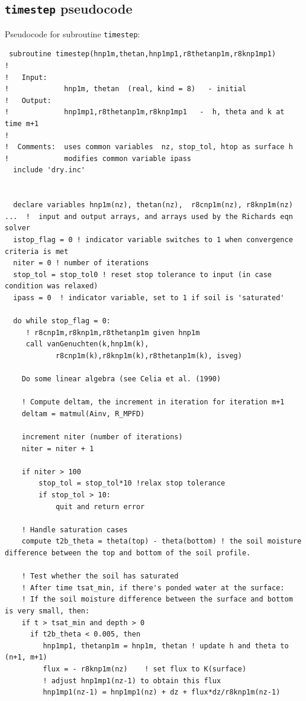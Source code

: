 \documentclass{article}
\newcommand{\code}[1]{\texttt{#1}}
\begin{document}
\subsection{\code{timestep} pseudocode}

Pseudocode for subroutine \code{timestep}:

\begin{lstlisting}
 subroutine timestep(hnp1m,thetan,hnp1mp1,r8thetanp1m,r8knp1mp1)
!
!   Input:
!             hnp1m, thetan  (real, kind = 8)   - initial
!   Output:
!             hnp1mp1,r8thetanp1m,r8knp1mp1   -  h, theta and k at time m+1
!             
!  Comments:  uses common variables  nz, stop_tol, htop as surface h   
!             modifies common variable ipass
  include 'dry.inc'
  

  declare variables hnp1m(nz), thetan(nz),  r8cnp1m(nz), r8knp1m(nz) ...  !  input and output arrays, and arrays used by the Richards eqn solver
  istop_flag = 0 ! indicator variable switches to 1 when convergence criteria is met
  niter = 0 ! number of iterations
  stop_tol = stop_tol0 ! reset stop tolerance to input (in case condition was relaxed)
  ipass = 0  ! indicator variable, set to 1 if soil is 'saturated'
	
  do while stop_flag = 0:
     ! r8cnp1m,r8knp1m,r8thetanp1m given hnp1m
     call vanGenuchten(k,hnp1m(k), 
     		r8cnp1m(k),r8knp1m(k),r8thetanp1m(k), isveg)

	Do some linear algebra (see Celia et al. (1990)
	
	! Compute deltam, the increment in iteration for iteration m+1	
	deltam = matmul(Ainv, R_MPFD)
	
 	increment niter (number of iterations)
 	niter = niter + 1
 	          
	if niter > 100
  		stop_tol = stop_tol*10 !relax stop tolerance
		if stop_tol > 10:
			quit and return error
			
	! Handle saturation cases
	compute t2b_theta = theta(top) - theta(bottom) ! the soil moisture difference between the top and bottom of the soil profile.

	! Test whether the soil has saturated
	! After time tsat_min, if there's ponded water at the surface: 
	! If the soil moisture difference between the surface and bottom is very small, then:
	if t > tsat_min and depth > 0  
	  if t2b_theta < 0.005, then  
	  	 hnp1mp1, thetanp1m = hnp1m, thetan ! update h and theta to (n+1, m+1)
	  	 flux = - r8knp1m(nz)    ! set flux to K(surface)
		 ! adjust hnp1mp1(nz-1) to obtain this flux
	  	 hnp1mp1(nz-1) = hnp1mp1(nz) + dz + flux*dz/r8knp1m(nz-1)
		 		

\end{lstlisting}
\end{document}
